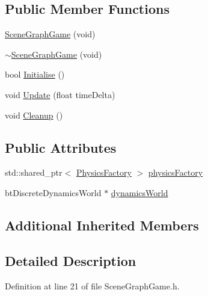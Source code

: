 \subsection*{Public Member Functions}
\begin{DoxyCompactItemize}
\item 
\hyperlink{class_b_g_e_1_1_scene_graph_game_a4ae3e202bea5b4131af0e6d7e15cd143}{Scene\-Graph\-Game} (void)
\item 
\hyperlink{class_b_g_e_1_1_scene_graph_game_ae13eb00ea3478bcab163e842047dcd0d}{$\sim$\-Scene\-Graph\-Game} (void)
\item 
bool \hyperlink{class_b_g_e_1_1_scene_graph_game_ae129b54e7ca57dcc6a8b821c569bebd7}{Initialise} ()
\item 
void \hyperlink{class_b_g_e_1_1_scene_graph_game_a0da77898a630ba53d2ca512f2992f7fb}{Update} (float time\-Delta)
\item 
void \hyperlink{class_b_g_e_1_1_scene_graph_game_a0fb4a9b70a6061c3827c98799b6b85fe}{Cleanup} ()
\end{DoxyCompactItemize}
\subsection*{Public Attributes}
\begin{DoxyCompactItemize}
\item 
std\-::shared\-\_\-ptr$<$ \hyperlink{class_b_g_e_1_1_physics_factory}{Physics\-Factory} $>$ \hyperlink{class_b_g_e_1_1_scene_graph_game_a50dc4ff0c63594495ca6fc5fa4441603}{physics\-Factory}
\item 
bt\-Discrete\-Dynamics\-World $\ast$ \hyperlink{class_b_g_e_1_1_scene_graph_game_a45b47315f225ce7f276561108d6cb0e7}{dynamics\-World}
\end{DoxyCompactItemize}
\subsection*{Additional Inherited Members}


\subsection{Detailed Description}


Definition at line 21 of file Scene\-Graph\-Game.\-h.



